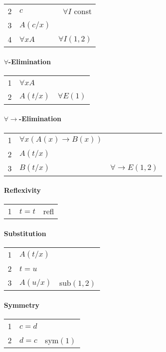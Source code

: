 \documentclass[10pt,twoside,twocolumn]{article}
\providecommand{\tabularnewline}{\\}
\begin{document}
\begin{tabular}{|llr|}
\hline 
2 & $c$ & $\forall I$ const\tabularnewline
3 & $A\left(c/x\right)$ & \tabularnewline
\hline 
\multicolumn{1}{l}{4} & $\forall xA$ & \multicolumn{1}{r}{$\forall I\left(1,2\right)$}\tabularnewline
\end{tabular}


\paragraph{$\boldsymbol{\forall}$-Elimination}

\begin{tabular}{llr}
1 & $\forall xA$ & \tabularnewline
2 & $A\left(t/x\right)$ & $\forall E\left(1\right)$\tabularnewline
\end{tabular}


\paragraph{$\boldsymbol{\forall}\rightarrow$-Elimination}

\begin{tabular}{llr}
1 & $\forall x\left(A\left(x\right)\rightarrow B\left(x\right)\right)$ & \tabularnewline
2 & $A\left(t/x\right)$ & \tabularnewline
3 & $B\left(t/x\right)$ & $\forall\rightarrow E\left(1,2\right)$\tabularnewline
\end{tabular}


\paragraph{Reflexivity}

\begin{tabular}{llr}
1 & $t=t$ & refl\tabularnewline
\end{tabular}


\paragraph{Substitution}

\begin{tabular}{llr}
1 & $A\left(t/x\right)$ & \tabularnewline
2 & $t=u$ & \tabularnewline
3 & $A\left(u/x\right)$ & sub$\left(1,2\right)$\tabularnewline
\end{tabular}


\paragraph{Symmetry}

\begin{tabular}{llr}
1 & $c=d$ & \tabularnewline
2 & $d=c$ & sym$\left(1\right)$\tabularnewline
\end{tabular}
\end{document}
